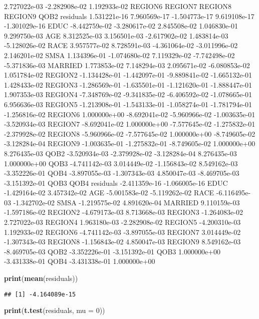 \documentclass[
]{article}
\newenvironment{Shaded}{\begin{snugshade}}{\end{snugshade}}
\newcommand{\AttributeTok}[1]{\textcolor[rgb]{0.13,0.29,0.53}{#1}}
\newcommand{\DecValTok}[1]{\textcolor[rgb]{0.00,0.00,0.81}{#1}}
\newcommand{\FunctionTok}[1]{\textcolor[rgb]{0.13,0.29,0.53}{\textbf{#1}}}
\newcommand{\NormalTok}[1]{#1}
\begin{document}
2.727022e-03 -2.282908e-02 1.192933e-02 REGION6 REGION7 REGION8 REGION9
QOB2 residuals 1.531221e-16 7.960569e-17 -1.504773e-17 9.619108e-17
-1.301029e-16 EDUC -8.442759e-02 -3.280617e-02 2.845508e-02 1.046830e-01
9.299750e-03 AGE 8.312525e-03 3.156501e-03 -2.617902e-02 1.483814e-03
-5.128026e-02 RACE 3.957577e-02 8.728591e-03 -4.361064e-02 -3.011996e-02
2.146201e-02 SMSA 1.134396e-01 -1.074680e-02 7.119329e-02 -7.742498e-02
-5.371836e-03 MARRIED 1.773853e-02 7.148294e-03 2.095671e-02
-6.080853e-02 1.051784e-02 REGION2 -1.134428e-01 -1.442097e-01
-9.889841e-02 -1.665132e-01 1.428433e-02 REGION3 -1.286569e-01
-1.635501e-01 -1.121620e-01 -1.888447e-01 1.907353e-03 REGION4
-7.348769e-02 -9.341835e-02 -6.406592e-02 -1.078665e-01 6.956636e-03
REGION5 -1.213908e-01 -1.543133e-01 -1.058274e-01 -1.781794e-01
-1.256816e-02 REGION6 1.000000e+00 -8.692041e-02 -5.960966e-02
-1.003635e-01 -3.520934e-03 REGION7 -8.692041e-02 1.000000e+00
-7.577645e-02 -1.275832e-01 -2.379928e-02 REGION8 -5.960966e-02
-7.577645e-02 1.000000e+00 -8.749605e-02 -3.128284e-04 REGION9
-1.003635e-01 -1.275832e-01 -8.749605e-02 1.000000e+00 8.276435e-03 QOB2
-3.520934e-03 -2.379928e-02 -3.128284e-04 8.276435e-03 1.000000e+00 QOB3
-4.741142e-03 3.014449e-02 -1.156843e-02 8.549162e-03 -3.352226e-01 QOB4
-3.897055e-03 -1.307343e-03 4.850047e-03 -8.469705e-03 -3.151392e-01
QOB3 QOB4 residuals -2.411359e-16 -1.066005e-16 EDUC -1.429164e-02
3.457342e-02 AGE -5.001583e-02 -5.119262e-02 RACE -6.116495e-03
-1.342702e-02 SMSA -1.219575e-02 4.891620e-04 MARRIED 9.110159e-03
-1.597186e-02 REGION2 -4.679173e-03 8.713668e-03 REGION3 -1.264083e-02
2.727022e-03 REGION4 1.963180e-03 -2.282908e-02 REGION5 -4.200310e-03
1.192933e-02 REGION6 -4.741142e-03 -3.897055e-03 REGION7 3.014449e-02
-1.307343e-03 REGION8 -1.156843e-02 4.850047e-03 REGION9 8.549162e-03
-8.469705e-03 QOB2 -3.352226e-01 -3.151392e-01 QOB3 1.000000e+00
-3.431338e-01 QOB4 -3.431338e-01 1.000000e+00

\begin{Shaded}
\begin{Highlighting}[]
\FunctionTok{print}\NormalTok{(}\FunctionTok{mean}\NormalTok{(residuals))}
\end{Highlighting}
\end{Shaded}

\begin{verbatim}
## [1] -4.164089e-15
\end{verbatim}

\begin{Shaded}
\begin{Highlighting}[]
\FunctionTok{print}\NormalTok{(}\FunctionTok{t.test}\NormalTok{(residuals, }\AttributeTok{mu =} \DecValTok{0}\NormalTok{))}
\end{Highlighting}
\end{Shaded}
\end{document}
